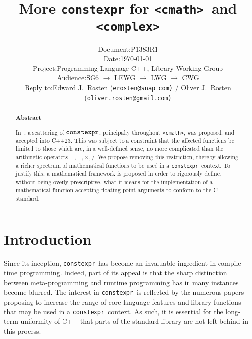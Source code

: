 \documentclass[prd,twocolumn,amsmath,amssymb,nofootinbib,eqsecnum]{revtex4-1}
\newcommand{\constexpr}{\code{constexpr}\xspace}
\newcommand{\code}[1]{{\tt #1}}
\newcommand{\header}[1]{{\tt <#1>}}
\newcommand{\cmath}{\header{cmath}}
\newcommand{\complex}{\header{complex}}
\newcommand{\Operators}{\ensuremath{+,-,\times,/}}
\begin{document}
\title{More \constexpr for \cmath\ and \complex}

\author{
\hspace{11.5em}
\begin{tabular}{ll}
	Document: & P1383R1
\\
	Date: & \today
\\
	Project: & Programming Language C++, Library Working Group
\\
	Audience: & SG6 $\rightarrow$ LEWG $\rightarrow$ LWG $\rightarrow$ CWG
\\
	Reply to: & Edward J.\ Rosten {(\tt erosten@snap.com)}
 / Oliver J.\ Rosten {(\tt oliver.rosten@gmail.com)}
\end{tabular}
}

\begin{abstract}

\begin{center} {\bf Abstract} \end{center}

In~\cite{Rosten-constexpr}, a scattering of $\constexpr$, principally throughout \cmath, was proposed, and accepted into C++23. This was subject to a constraint that the affected functions be limited to those which are, in a well-defined sense, no more complicated than the arithmetic operators \Operators. We propose removing this restriction, thereby allowing a richer spectrum of mathematical functions to be used in a \constexpr\ context. To justify this, a mathematical framework is proposed in order to rigorously define, without being overly prescriptive, what it means for the implementation of a mathematical function accepting floating-point arguments to conform to the C++ standard.
	
\end{abstract}


\maketitle

\tableofcontents

\section{Introduction}

Since its inception, \constexpr\ has become an invaluable ingredient in compile-time programming. Indeed, part of its appeal is that the sharp distinction between meta-programming and runtime programming has in many instances become blurred. The interest in \constexpr\ is reflected by the numerous papers proposing to increase the range of core language features and library functions that may be used in a \constexpr\ context. As such, it is essential for the long-term uniformity of C++ that parts of the standard library are not left behind in this process.
\end{document}
